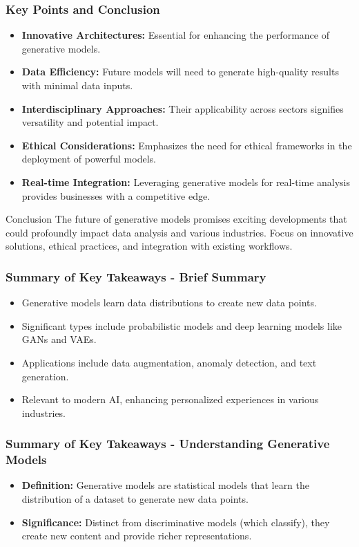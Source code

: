 \documentclass[aspectratio=169]{beamer}
\begin{document}
\begin{frame}[fragile]
    \frametitle{Key Points and Conclusion}
    \begin{itemize}
        \item \textbf{Innovative Architectures:} Essential for enhancing the performance of generative models.
        \item \textbf{Data Efficiency:} Future models will need to generate high-quality results with minimal data inputs.
        \item \textbf{Interdisciplinary Approaches:} Their applicability across sectors signifies versatility and potential impact.
        \item \textbf{Ethical Considerations:} Emphasizes the need for ethical frameworks in the deployment of powerful models.
        \item \textbf{Real-time Integration:} Leveraging generative models for real-time analysis provides businesses with a competitive edge.
    \end{itemize}
    
    \begin{block}{Conclusion}
        The future of generative models promises exciting developments that could profoundly impact data analysis and various industries. Focus on innovative solutions, ethical practices, and integration with existing workflows.
    \end{block}
\end{frame}

\begin{frame}[fragile]
    \frametitle{Summary of Key Takeaways - Brief Summary}
    \begin{itemize}
        \item Generative models learn data distributions to create new data points.
        \item Significant types include probabilistic models and deep learning models like GANs and VAEs.
        \item Applications include data augmentation, anomaly detection, and text generation.
        \item Relevant to modern AI, enhancing personalized experiences in various industries.
    \end{itemize}
\end{frame}

\begin{frame}[fragile]
    \frametitle{Summary of Key Takeaways - Understanding Generative Models}
    \begin{itemize}
        \item \textbf{Definition:} 
        Generative models are statistical models that learn the distribution of a dataset to generate new data points.
        \item \textbf{Significance:} 
        Distinct from discriminative models (which classify), they create new content and provide richer representations.
    \end{itemize}
\end{frame}
\end{document}
